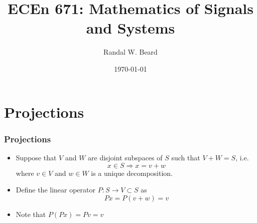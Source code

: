 \documentclass{beamer}
\title{ECEn 671: Mathematics of Signals and Systems}
\author{Randal W. Beard}
\institute{Brigham Young University}
\date{\today}
\begin{document}
\begin{frame}
	\titlepage
\end{frame}



\section{Projections}
\frame{\sectionpage}

\begin{frame}\frametitle{Projections}
\begin{itemize}

\item Suppose that $V$ and $W$ are disjoint subspaces of $S$ such that $V + W = S$, i.e.
\[ x \in S \Rightarrow x = v + w\]
where $v \in V$ and $w \in W$ is a unique decomposition.

\item Define the linear operator $P:S\to V \subset S$ as 
\[ Px = P(v+w) = v \]

\item Note that $P(Px) = Pv = v$
\end{itemize}
	
\end{frame}
\end{document}
